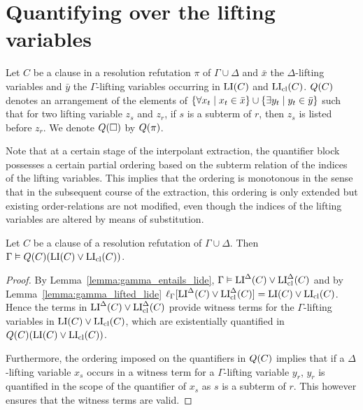 \documentclass[,%
	draft=false,%
	numbers=noendperiod
	11pt,
	a4paper,
	oneside,%
	openany,
]{memoir}
\begin{document}
\section{Quantifying over the lifting variables}

\begin{defi}
	\label{def:arrow_quantifier_block}
	Let $C$ be a clause in a resolution refutation $\pi$ of $\Gamma\cup\Delta$
	and $\bar x$ the $\Delta$-lifting variables and $\bar y$ the $\Gamma$-lifting variables occurring in $\operatorname{LI}(C)$ and $\operatorname{LI}_{\operatorname{cl}}(C)$.
	$Q(C)$ denotes an arrangement of the elements of  $\{ \forall x_t \mid\nolinebreak x_t \in \bar x\} \cup \{ \exists y_t \mid y_t \in \bar y\}$ such that for two lifting variable $z_s$ and $z_r$, if $s$ is a subterm of $r$, then $z_s$ is listed before $z_r$.
	We denote $Q(\square)$ by $Q(\pi)$.
\end{defi}

Note that at a certain stage of the interpolant extraction, the quantifier block possesses a certain partial ordering based on the subterm relation of the indices of the lifting variables.
This implies that the ordering is monotonous in the sense that in the subsequent course of the extraction, this ordering is only extended but existing order-relations are not modified, even though the indices of the lifting variables are altered by means of substitution.


\begin{lemma}
	\label{lemma:gamma_entails_quantified_lide}
	Let $C$ be a clause of a resolution refutation of $\Gamma\cup\Delta$. Then
	$\Gamma\vDash Q(C)(\operatorname{LI}(C) \lor \operatorname{LI}_{\operatorname{cl}}(C))$.
\end{lemma}
\begin{proof}
	By Lemma~\ref{lemma:gamma_entails_lide},
	$\Gamma\vDash \operatorname{LI}^\Delta(C) \lor \operatorname{LI}_{\operatorname{cl}}^\Delta(C)$ and 
	by Lemma~\ref{lemma:gamma_lifted_lide}
	$\ell_{\Gamma}[ \operatorname{LI}^\Delta(C) \lor \operatorname{LI}_{\operatorname{cl}}^\Delta(C)] = \operatorname{LI}(C) \lor \operatorname{LI}_{\operatorname{cl}}(C)$.
	Hence the terms in $\operatorname{LI}^\Delta(C) \lor \operatorname{LI}_{\operatorname{cl}}^\Delta(C)$ provide witness terms for the $\Gamma$-lifting variables in $\operatorname{LI}(C) \lor \operatorname{LI}_{\operatorname{cl}}(C)$, which are existentially quantified in $Q(C) (\operatorname{LI}(C) \lor \operatorname{LI}_{\operatorname{cl}}(C))$.

	Furthermore, the ordering imposed on the quantifiers in $Q(C)$ implies that if a $\Delta$-lifting variable $x_s$ occurs in a witness term for a $\Gamma$-lifting variable $y_r$, $y_r$ is quantified in the scope of the quantifier of $x_s$ as $s$ is a subterm of $r$.
	This however ensures that the witness terms are valid.
\end{proof}
\end{document}
